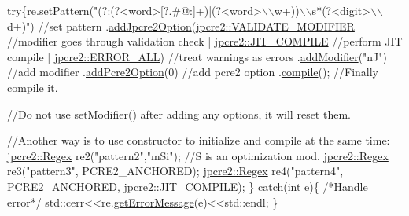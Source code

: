 \begin{DoxyCode}
\textcolor{keywordflow}{try}\{re.\hyperlink{classjpcre2_1_1Regex_a85d9a514ea86ae68533223adac6c6bd8}{setPattern}(\textcolor{stringliteral}{"(?:(?<word>[?.#@:]+)|(?<word>\(\backslash\)\(\backslash\)w+))\(\backslash\)\(\backslash\)s*(?<digit>\(\backslash\)\(\backslash\)d+)"})  \textcolor{comment}{//set pattern}
      .\hyperlink{classjpcre2_1_1Regex_a03974fa7ba8f7c47186cb8d6f54934de}{addJpcre2Option}(\hyperlink{namespacejpcre2_a85c143271501e383843f45b9999c2f00a9124b768bcae4d51430aa7f26126f387}{jpcre2::VALIDATE\_MODIFIER}                   
               \textcolor{comment}{//modifier goes through validation check}
                        | \hyperlink{namespacejpcre2_a85c143271501e383843f45b9999c2f00a5e8bab7c478015b19baf3e84ed00876e}{jpcre2::JIT\_COMPILE}                               \textcolor{comment}{//perform
       JIT compile}
                        | \hyperlink{namespacejpcre2_a85c143271501e383843f45b9999c2f00a6fec35fc9fdd8a606bed430c1816c552}{jpcre2::ERROR\_ALL})                                \textcolor{comment}{//treat
       warnings as errors}
      .\hyperlink{classjpcre2_1_1Regex_ab1af1471339602446d8221b8c97c6b55}{addModifier}(\textcolor{stringliteral}{"nJ"})                                                    \textcolor{comment}{//add modifier}
      .\hyperlink{classjpcre2_1_1Regex_a2c7dcf12f26b2b046e147b013c8b5087}{addPcre2Option}(0)                                                    \textcolor{comment}{//add pcre2
       option}
      .\hyperlink{classjpcre2_1_1Regex_aad1d5ef1e87f762f68a587eec4022e69}{compile}();                                                           \textcolor{comment}{//Finally compile it.}

    \textcolor{comment}{//Do not use setModifier() after adding any options, it will reset them.}

    \textcolor{comment}{//Another way is to use constructor to initialize and compile at the same time:}
    \hyperlink{classjpcre2_1_1Regex}{jpcre2::Regex} re2(\textcolor{stringliteral}{"pattern2"},\textcolor{stringliteral}{"mSi"});  \textcolor{comment}{//S is an optimization mod.}
    \hyperlink{classjpcre2_1_1Regex}{jpcre2::Regex} re3(\textcolor{stringliteral}{"pattern3"}, PCRE2\_ANCHORED);
    \hyperlink{classjpcre2_1_1Regex}{jpcre2::Regex} re4(\textcolor{stringliteral}{"pattern4"}, PCRE2\_ANCHORED, 
      \hyperlink{namespacejpcre2_a85c143271501e383843f45b9999c2f00a5e8bab7c478015b19baf3e84ed00876e}{jpcre2::JIT\_COMPILE});
\}
\textcolor{keywordflow}{catch}(\textcolor{keywordtype}{int} e)\{
    \textcolor{comment}{/*Handle error*/}
    std::cerr<<re.\hyperlink{classjpcre2_1_1Regex_a83b93ff7f6860757445e5edbecbfb7a2}{getErrorMessage}(e)<<std::endl;
\}
\end{DoxyCode}


